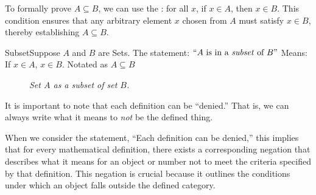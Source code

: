 To formally prove \( A \subseteq B \), we can use the : for all \( x \), if \( x \in A \), then \( x \in B \). This condition ensures that any arbitrary element \( x \) chosen from \( A \) must satisfy \( x \in B \), thereby establishing \( A \subseteq B \).

\begin{definition}
    {Subset}Suppose $A$ and $B$ are Sets. The statement: $\text{``}A \text{ is in a \textit{subset} of } B\text{''}$ 
    Means: If $x \in A$, $x \in B$. Notated as $A \subseteq B$
\end{definition}



\begin{figure}[htbp]
    \centering
    \caption{\textit{Set $A$ as a subset of set $B$.}}
\end{figure}


It is important to note that each definition can be ``denied.'' That is, we can always write what it means to \textit{not} be the defined thing.

When we consider the statement, ``Each definition can be denied,'' this implies that for every mathematical definition, there exists a corresponding negation that describes what it means for an object or number not to meet the criteria specified by that definition. This negation is crucial because it outlines the conditions under which an object falls outside the defined category.


